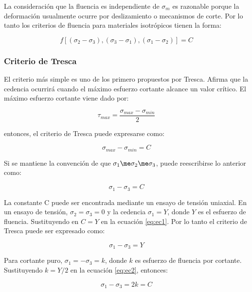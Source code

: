 La consideración que la fluencia es independiente de $\sigma_m$ es razonable porque la deformación usualmente ocurre por deslizamiento o mecanismos de corte. Por lo tanto los criterios de fluencia para materiales isotrópicos tienen la forma:

\begin{equation}
f[(\sigma_2-\sigma_3 ),(\sigma_3-\sigma_1 ),(\sigma_1-\sigma_2 )] = C
\end{equation}

\subsubsection{Criterio de Tresca}

El criterio más simple es uno de los primero propuestos por Tresca. Afirma que la cedencia ocurrirá cuando el máximo 
esfuerzo cortante alcance un valor crítico. El máximo esfuerzo cortante viene dado por:

\begin{equation}
\tau_{max} = \frac{\sigma_{max}-\sigma_{min}}{2}
\end{equation}

entonces, el criterio de Tresca puede expresarse como:

\begin{equation}
\sigma_{max} - \sigma_{min} = C
\end{equation}

Si se mantiene la convención de que $ \sigma_1 \me \sigma_2 \me \sigma_3 $, puede reescribirse lo anterior como:

\begin{equation}\label{eq:ec1}
\sigma_1 - \sigma_3 = C
\end{equation}

La constante C puede ser encontrada mediante un ensayo de tensión uniaxial. En un ensayo de tensión, 
$\sigma_2 = \sigma_3 = 0$ y la cedencia $\sigma_1 = Y$, donde $Y$ es el esfuerzo de fluencia. Sustituyendo 
en $C=Y$ en la ecuación \ref{eq:ec1}. Por lo tanto el criterio de Tresca puede ser expresado como:

\begin{equation}\label{eq:ec2}
\sigma_1 - \sigma_3 = Y
\end{equation}

Para cortante puro, $ \sigma_1 = -\sigma_3 = k$, donde $k$ es esfuerzo de fluencia por cortante. Sustituyendo 
$ k = Y/2 $ en la ecuación \ref{eq:ec2}, entonces:

\begin{equation}
\sigma_1 - \sigma_3 = 2k = C
\end{equation}

